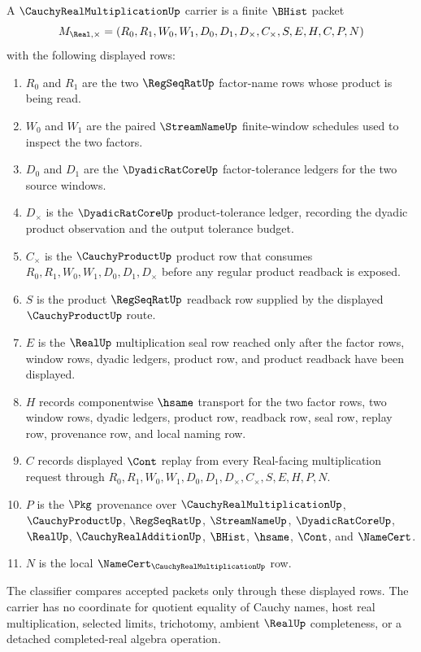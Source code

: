 \begin{definition}
\label{def:cauchy-real-multiplication-carrier}
A $\CauchyRealMultiplicationUp$ carrier is a finite $\BHist$ packet
$$
M_{\Real,\times}=(R_0,R_1,W_0,W_1,D_0,D_1,D_\times,C_\times,S,E,H,C,P,N)
$$
with the following displayed rows:
\begin{enumerate}
\item $R_0$ and $R_1$ are the two $\RegSeqRatUp$ factor-name rows whose product is being read.
\item $W_0$ and $W_1$ are the paired $\StreamNameUp$ finite-window schedules used to inspect the two factors.
\item $D_0$ and $D_1$ are the $\DyadicRatCoreUp$ factor-tolerance ledgers for the two source windows.
\item $D_\times$ is the $\DyadicRatCoreUp$ product-tolerance ledger, recording the dyadic product observation and the output tolerance budget.
\item $C_\times$ is the $\CauchyProductUp$ product row that consumes $R_0,R_1,W_0,W_1,D_0,D_1,D_\times$ before any regular product readback is exposed.
\item $S$ is the product $\RegSeqRatUp$ readback row supplied by the displayed $\CauchyProductUp$ route.
\item $E$ is the $\RealUp$ multiplication seal row reached only after the factor rows, window rows, dyadic ledgers, product row, and product readback have been displayed.
\item $H$ records componentwise $\hsame$ transport for the two factor rows, two window rows, dyadic ledgers, product row, readback row, seal row, replay row, provenance row, and local naming row.
\item $C$ records displayed $\Cont$ replay from every Real-facing multiplication request through $R_0,R_1,W_0,W_1,D_0,D_1,D_\times,C_\times,S,E,H,P,N$.
\item $P$ is the $\Pkg$ provenance over $\CauchyRealMultiplicationUp$, $\CauchyProductUp$, $\RegSeqRatUp$, $\StreamNameUp$, $\DyadicRatCoreUp$, $\RealUp$, $\CauchyRealAdditionUp$, $\BHist$, $\hsame$, $\Cont$, and $\NameCert$.
\item $N$ is the local $\NameCert_{\CauchyRealMultiplicationUp}$ row.
\end{enumerate}
The classifier compares accepted packets only through these displayed rows. The carrier has no coordinate for quotient equality of Cauchy names, host real multiplication, selected limits, trichotomy, ambient $\RealUp$ completeness, or a detached completed-real algebra operation.
\end{definition}

